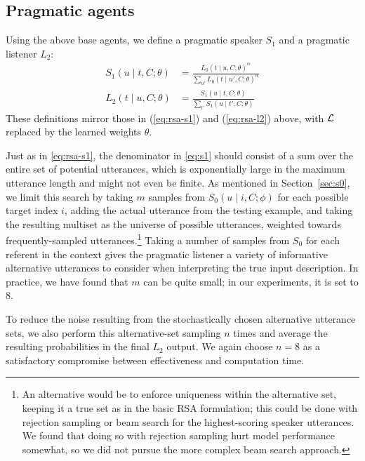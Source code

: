 \documentclass[11pt,letterpaper]{article}
\newcommand{\eq}[1]{(\ref{#1})}
\newcommand{\Listener}{L}
\newcommand{\Speaker}{S}
\newcommand{\utt}{u}
\newcommand{\context}{C}
\newcommand{\target}{t}
\newcommand{\numsamples}{m}
\renewcommand{\|}{\mid}
\newcommand{\secref}[1]{Section~\ref{#1}}
\begin{document}
\subsection{Pragmatic agents}\label{sec:l2}

Using the above base agents, we define a pragmatic speaker
$\Speaker_{1}$ and a pragmatic listener
$\Listener_{2}$:
%
\begin{align}
\Speaker_1(\utt \| \target, \context; \theta)
  &= \frac{\Listener_0(\target \| \utt, \context; \theta)^\alpha}{\sum_{\utt'}
    \Listener_0(\target \| \utt', \context; \theta)^\alpha}
    \label{eq:s1} \\
  \Listener_2(\target \| \utt, \context; \theta)
  &=
    \frac{
    \Speaker_1(\utt \| \target, \context; \theta)
    }{
    \sum_{\target'} \Speaker_1(\utt \| \target', \context; \theta)
    }
\end{align}
These definitions mirror those in \eq{eq:rsa-s1} and \eq{eq:rsa-l2}
above, with $\mathcal{L}$ replaced by the learned weights $\theta$.

Just as in \eqref{eq:rsa-s1}, the denominator in \eqref{eq:s1} should consist of a sum over
the entire set of potential utterances, which is exponentially large in the
maximum utterance length and might not even be finite.
As mentioned in \secref{sec:s0}, we limit this search by
taking $\numsamples$ samples from $\Speaker_0(\utt \| i, \context; \phi)$ for
each possible target index $i$, adding the actual utterance from the testing example,
and taking the resulting multiset as the universe of possible utterances,
weighted towards frequently-sampled utterances.\footnote{An alternative would
be to enforce uniqueness within the alternative set, keeping it a true set as in the
basic RSA formulation; this could be done with rejection sampling or beam search
for the highest-scoring speaker utterances. We found that doing so with
rejection sampling hurt model performance somewhat, so we did not
pursue the more complex beam search approach.} Taking a number
of samples from $\Speaker_0$ for each referent in the context gives the pragmatic
listener a variety of informative alternative utterances to consider when
interpreting the true input description.
In practice, we have found that $\numsamples$
can be quite small; in our experiments, it is set to $8$.

To reduce the noise
resulting from the stochastically chosen alternative utterance sets, we also perform
this alternative-set sampling $n$ times and average the resulting probabilities in
the final $\Listener_2$ output. We again choose $n = 8$ as a satisfactory
compromise between effectiveness and computation time.
\end{document}
